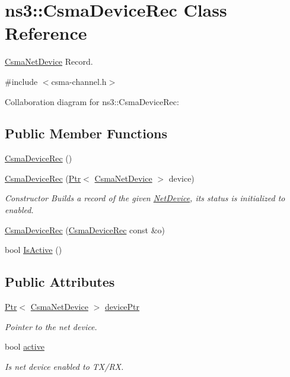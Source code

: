 \hypertarget{classns3_1_1CsmaDeviceRec}{}\section{ns3\+:\+:Csma\+Device\+Rec Class Reference}
\label{classns3_1_1CsmaDeviceRec}


\hyperlink{classns3_1_1CsmaNetDevice}{Csma\+Net\+Device} Record.  




{\ttfamily \#include $<$csma-\/channel.\+h$>$}



Collaboration diagram for ns3\+:\+:Csma\+Device\+Rec\+:
\subsection*{Public Member Functions}
\begin{DoxyCompactItemize}
\item 
\hyperlink{classns3_1_1CsmaDeviceRec_aedfe0aea4b4035a35a81f22e3d89bb8d}{Csma\+Device\+Rec} ()
\item 
\hyperlink{classns3_1_1CsmaDeviceRec_a7952c755523bbfbe82974675c8f05207}{Csma\+Device\+Rec} (\hyperlink{classns3_1_1Ptr}{Ptr}$<$ \hyperlink{classns3_1_1CsmaNetDevice}{Csma\+Net\+Device} $>$ device)
\begin{DoxyCompactList}\small\item\em Constructor Builds a record of the given \hyperlink{classns3_1_1NetDevice}{Net\+Device}, its status is initialized to enabled. \end{DoxyCompactList}\item 
\hyperlink{classns3_1_1CsmaDeviceRec_aec02621ff547a99d6e87d6f91a5f3900}{Csma\+Device\+Rec} (\hyperlink{classns3_1_1CsmaDeviceRec}{Csma\+Device\+Rec} const \&o)
\item 
bool \hyperlink{classns3_1_1CsmaDeviceRec_a9ac9fca7c7f826ee8a021cdd7769ace2}{Is\+Active} ()
\end{DoxyCompactItemize}
\subsection*{Public Attributes}
\begin{DoxyCompactItemize}
\item 
\hyperlink{classns3_1_1Ptr}{Ptr}$<$ \hyperlink{classns3_1_1CsmaNetDevice}{Csma\+Net\+Device} $>$ \hyperlink{classns3_1_1CsmaDeviceRec_a14747fb45ce500d431bc4bba05147651}{device\+Ptr}
\begin{DoxyCompactList}\small\item\em Pointer to the net device. \end{DoxyCompactList}\item 
bool \hyperlink{classns3_1_1CsmaDeviceRec_ae9d33ec7c3a7440763bf01556ef77457}{active}
\begin{DoxyCompactList}\small\item\em Is net device enabled to T\+X/\+RX. \end{DoxyCompactList}\end{DoxyCompactItemize}


